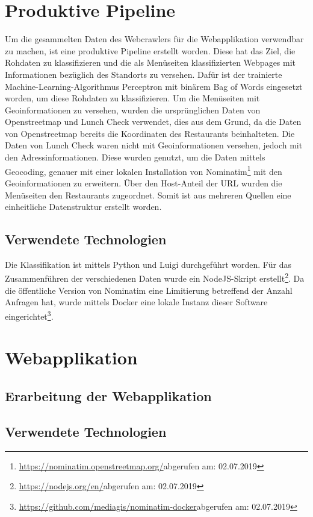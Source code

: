 \section{Produktive Pipeline}
Um die gesammelten Daten des Webcrawlers für die Webapplikation verwendbar zu machen, ist eine produktive Pipeline erstellt worden.
Diese hat das Ziel, die Rohdaten zu klassifizieren und die als Menüseiten klassifizierten Webpages mit Informationen bezüglich des Standorts zu versehen.
Dafür ist der trainierte Machine-Learning-Algorithmus \glqq Perceptron mit binärem Bag of Words\grqq{} eingesetzt worden, um diese Rohdaten zu klassifizieren.
Um die Menüseiten mit Geoinformationen zu versehen, wurden die ursprünglichen Daten von Openstreetmap und Lunch Check verwendet, dies aus dem Grund, da die Daten von Openstreetmap bereits die Koordinaten des Restaurants beinhalteten.
Die Daten von Lunch Check waren nicht mit Geoinformationen versehen, jedoch mit den Adressinformationen.
Diese wurden genutzt, um  die Daten mittels Geocoding, genauer mit einer lokalen Installation von Nominatim\footnote{\url{https://nominatim.openstreetmap.org/}abgerufen am: 02.07.2019} mit den Geoinformationen zu erweitern.
Über den Host-Anteil der URL wurden die Menüseiten den Restaurants zugeordnet.
Somit ist aus mehreren Quellen eine einheitliche Datenstruktur erstellt worden.
\subsection{Verwendete Technologien}
Die Klassifikation ist mittels Python und Luigi durchgeführt worden.
Für das Zusammenführen der verschiedenen Daten wurde ein NodeJS-Skript erstellt\footnote{\url{https://nodejs.org/en/}abgerufen am: 02.07.2019}.
Da die öffentliche Version von Nominatim eine Limitierung betreffend der Anzahl Anfragen hat, wurde mittels Docker eine lokale Instanz dieser Software eingerichtet\footnote{\url{https://github.com/mediagis/nominatim-docker}abgerufen am: 02.07.2019}.
\section{Webapplikation}
\subsection{Erarbeitung der Webapplikation}
\subsection{Verwendete Technologien}
